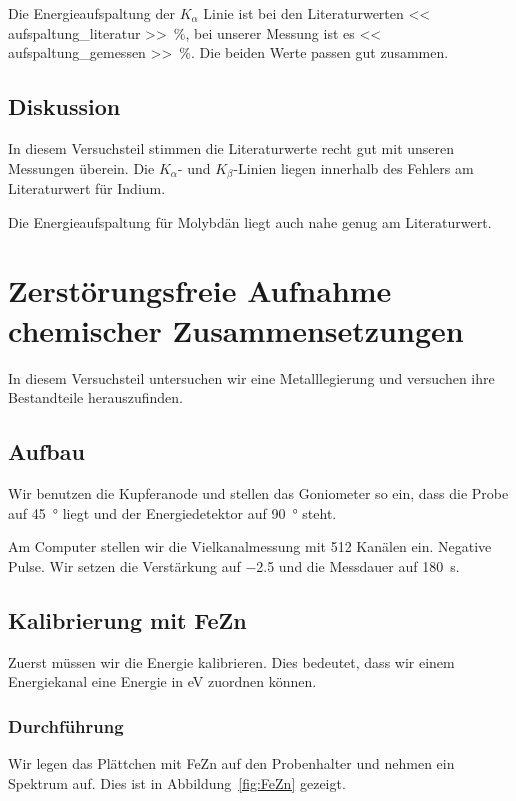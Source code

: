 Die Energieaufspaltung der $K_\alpha$ Linie ist bei den Literaturwerten \SI{<<
aufspaltung_literatur >>}{\percent}, bei unserer Messung ist es \SI{<<
aufspaltung_gemessen >>}{\percent}. Die beiden Werte passen gut zusammen.

\section{Diskussion}

In diesem Versuchsteil stimmen die Literaturwerte recht gut mit unseren
Messungen überein. Die $K_\alpha$- und $K_\beta$-Linien liegen innerhalb des
Fehlers am Literaturwert für Indium.

Die Energieaufspaltung für Molybdän liegt auch nahe genug am Literaturwert.

\chapter{Zerstörungsfreie Aufnahme chemischer Zusammensetzungen}

In diesem Versuchsteil untersuchen wir eine Metalllegierung und versuchen ihre
Bestandteile herauszufinden.

\section{Aufbau}

Wir benutzen die Kupferanode und stellen das Goniometer so ein, dass die Probe
auf \SI{45}{\degree} liegt und der Energiedetektor auf \SI{90}{\degree} steht.

Am Computer stellen wir die Vielkanalmessung mit 512 Kanälen ein. Negative
Pulse. Wir setzen die Verstärkung auf \num{-2.5} und die Messdauer auf
\SI{180}{\second}.

\section{Kalibrierung mit FeZn}

Zuerst müssen wir die Energie kalibrieren. Dies bedeutet, dass wir einem
Energiekanal eine Energie in \si{\electronvolt} zuordnen können.

\subsection{Durchführung}

Wir legen das Plättchen mit FeZn auf den Probenhalter und nehmen ein Spektrum
auf. Dies ist in Abbildung~\ref{fig:FeZn} gezeigt.

